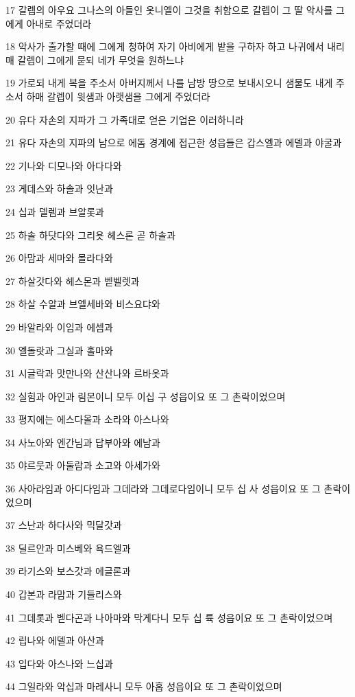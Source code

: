 \par 17 갈렙의 아우요 그나스의 아들인 옷니엘이 그것을 취함으로 갈렙이 그 딸 악사를 그에게 아내로 주었더라
\par 18 악사가 출가할 때에 그에게 청하여 자기 아비에게 밭을 구하자 하고 나귀에서 내리매 갈렙이 그에게 묻되 네가 무엇을 원하느냐
\par 19 가로되 내게 복을 주소서 아버지께서 나를 남방 땅으로 보내시오니 샘물도 내게 주소서 하매 갈렙이 윗샘과 아랫샘을 그에게 주었더라
\par 20 유다 자손의 지파가 그 가족대로 얻은 기업은 이러하니라
\par 21 유다 자손의 지파의 남으로 에돔 경계에 접근한 성읍들은 갑스엘과 에델과 야굴과
\par 22 기나와 디모나와 아다다와
\par 23 게데스와 하솔과 잇난과
\par 24 십과 델렘과 브알롯과
\par 25 하솔 하닷다와 그리욧 헤스론 곧 하솔과
\par 26 아맘과 세마와 몰라다와
\par 27 하살갓다와 헤스몬과 벧벨렛과
\par 28 하살 수알과 브엘세바와 비스요댜와
\par 29 바알라와 이임과 에셈과
\par 30 엘돌랏과 그실과 홀마와
\par 31 시글락과 맛만나와 산산나와 르바옷과
\par 32 실힘과 아인과 림몬이니 모두 이십 구 성읍이요 또 그 촌락이었으며
\par 33 평지에는 에스다올과 소라와 아스나와
\par 34 사노아와 엔간님과 답부아와 에남과
\par 35 야르뭇과 아둘람과 소고와 아세가와
\par 36 사아라임과 아디다임과 그데라와 그데로다임이니 모두 십 사 성읍이요 또 그 촌락이었으며
\par 37 스난과 하다사와 믹달갓과
\par 38 딜르안과 미스베와 욕드엘과
\par 39 라기스와 보스갓과 에글론과
\par 40 갑본과 라맘과 기들리스와
\par 41 그데롯과 벧다곤과 나아마와 막게다니 모두 십 륙 성읍이요 또 그 촌락이었으며
\par 42 립나와 에델과 아산과
\par 43 입다와 아스나와 느십과
\par 44 그일라와 악십과 마레사니 모두 아홉 성읍이요 또 그 촌락이었으며
